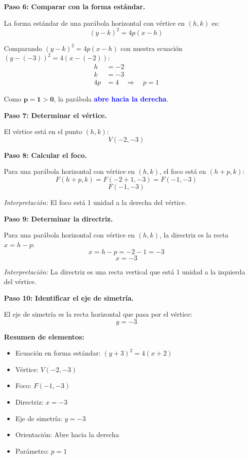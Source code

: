 \documentclass[12pt,a4paper]{article}
\begin{document}
	\textbf{Paso 6: Comparar con la forma estándar.}

	La forma estándar de una parábola horizontal con vértice en \((h,k)\) es:
	\[
	(y-k)^2=4p(x-h)
	\]

	Comparando 	\((y-k)^2=4p(x-h)\) con nuestra ecuación \((y-(-3))^2=4(x-(-2))\):
	\[
	\begin{aligned}
		h &= -2 \\
		k &= -3 \\
		4p &= 4 \quad\Rightarrow\quad p=1
	\end{aligned}
	\]

	Como \(\mathbf{p=1>0}\), la parábola \textcolor{blue}{\textbf{abre hacia la derecha}}.

	\bigskip

	\textbf{Paso 7: Determinar el vértice.}

	El vértice está en el punto \((h,k)\):
	\[
	\boxed{V(-2,-3)}
	\]

	\textbf{Paso 8: Calcular el foco.}

	Para una parábola horizontal con vértice en \((h,k)\), el foco está en \((h+p,k)\):
	\[
	F(h+p,k)=F(-2+1,-3)=F(-1,-3)
	\]
	\[
	\boxed{F(-1,-3)}
	\]

	\emph{Interpretación:} El foco está 1 unidad a la derecha del vértice.

	\bigskip

	\textbf{Paso 9: Determinar la directriz.}

	Para una parábola horizontal con vértice en \((h,k)\), la directriz es la recta \(x=h-p\):
	\[
	x=h-p=-2-1=-3
	\]
	\[
	\boxed{x=-3}
	\]

	\emph{Interpretación:} La directriz es una recta vertical que está 1 unidad a la izquierda del vértice.

	\bigskip

	\textbf{Paso 10: Identificar el eje de simetría.}

	El eje de simetría es la recta horizontal que pasa por el vértice:
	\[
	y=-3
	\]

	\bigskip

	\textbf{Resumen de elementos:}
	\begin{itemize}
		\item Ecuación en forma estándar: \((y+3)^2=4(x+2)\)
		\item Vértice: \(V(-2,-3)\)
		\item Foco: \(F(-1,-3)\)
		\item Directriz: \(x=-3\)
		\item Eje de simetría: \(y=-3\)
		\item Orientación: Abre hacia la derecha
		\item Parámetro: \(p=1\)
	\end{itemize}
\end{document}
